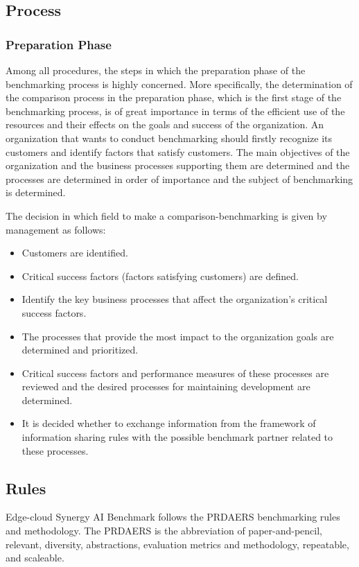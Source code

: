 \subsection{Process}

\subsubsection{Preparation Phase} Among all procedures, the steps in which the preparation phase of the benchmarking process is highly concerned. More specifically, the determination of the comparison process in the preparation phase, which is the first stage of the benchmarking process, is of great importance in terms of the efficient use of the resources and their effects on the goals and success of the organization. An organization that wants to conduct benchmarking should firstly recognize its customers and identify factors that satisfy customers. The main objectives of the organization and the business processes supporting them are determined and the processes are determined in order of importance and the subject of benchmarking is determined.

The decision in which field to make a comparison-benchmarking is given by management as follows:
\begin{itemize}
    \item Customers are identified.
    \item Critical success factors (factors satisfying customers) are defined.
    \item Identify the key business processes that affect the organization's critical success factors.
    \item The processes that provide the most impact to the organization goals are determined and prioritized.
    \item Critical success factors and performance measures of these processes are reviewed and the desired processes for maintaining development are determined.
    \item It is decided whether to exchange information from the framework of information sharing rules with the possible benchmark partner related to these processes.
\end{itemize}


\subsection{Rules}
Edge-cloud Synergy AI Benchmark follows the PRDAERS benchmarking rules and methodology. The PRDAERS is the abbreviation of paper-and-pencil, relevant, diversity, abstractions, evaluation metrics and methodology, repeatable, and scaleable.

